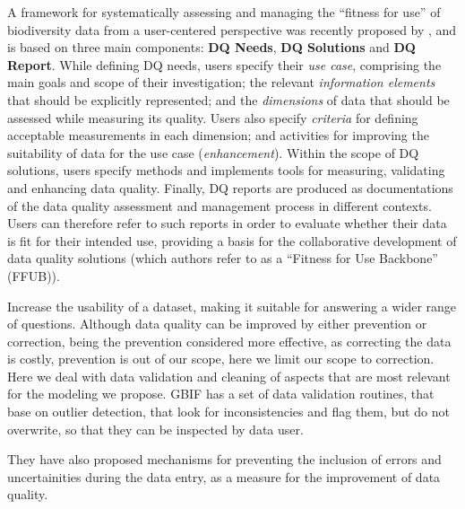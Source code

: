 A framework for systematically assessing and managing the ``fitness for use'' of biodiversity data from a user-centered perspective was recently proposed by , and is based on three main components: \textbf{DQ Needs}, \textbf{DQ Solutions} and \textbf{DQ Report}.
%
While defining DQ needs, users specify their \textit{use case}, comprising the main goals and scope of their investigation; the relevant \textit{information elements} that should be explicitly represented; and the \textit{dimensions} of data that should be assessed while measuring its quality.
Users also specify \textit{criteria} for defining acceptable measurements in each dimension; and activities for improving the suitability of data for the use case (\textit{enhancement}).
%
Within the scope of DQ solutions, users specify methods and implements tools for measuring, validating and enhancing data quality.
%
Finally, DQ reports are produced as documentations of the data quality assessment and management process in different contexts.
Users can therefore refer to such reports in order to evaluate whether their data is fit for their intended use, providing a basis for the collaborative development of data quality solutions (which authors refer to as a ``Fitness for Use Backbone'' (FFUB)).




Increase the usability of a dataset, making it suitable for answering a wider range of questions.
Although data quality can be improved by either prevention or correction, being the prevention considered more effective, as correcting the data is costly\cite{Chapman2005}, prevention is out of our scope, here we limit our scope to correction.
Here we deal with data validation and cleaning of aspects that are most relevant for the modeling we propose.
GBIF has a set of data validation routines, that base on outlier detection, that look for inconsistencies and flag them, but do not overwrite, so that they can be inspected by data user.




They have also proposed mechanisms for preventing the inclusion of errors and uncertainities during the data entry, as a measure for the improvement of data quality.









